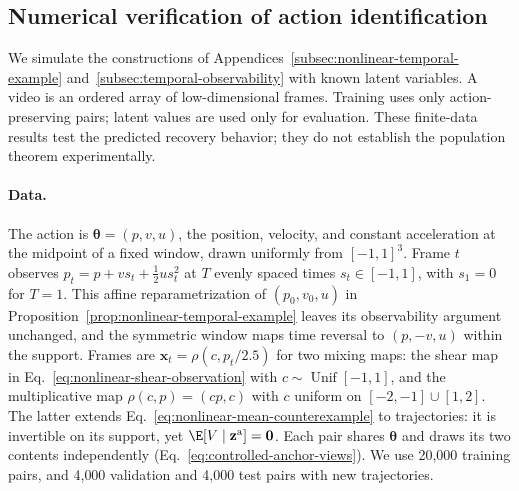 \subsection{Numerical verification of action identification}
\label{subsec:numerical-verification}

We simulate the constructions of
Appendices~\ref{subsec:nonlinear-temporal-example}
and~\ref{subsec:temporal-observability} with known latent variables.
A video is an ordered array of low-dimensional frames. Training uses only
action-preserving pairs; latent values are used only for evaluation.
These finite-data results test the predicted recovery behavior; they do
not establish the population theorem experimentally.

\paragraph{Data.}
The action is $\boldsymbol\theta=(p,v,u)$, the position, velocity, and
constant acceleration at the midpoint of a fixed window, drawn uniformly
from $[-1,1]^3$. Frame $t$ observes $p_t=p+vs_t+\tfrac12us_t^2$ at $T$
evenly spaced times $s_t\in[-1,1]$, with $s_1=0$ for $T=1$.
This affine reparametrization of $(p_0,v_0,u)$ in
Proposition~\ref{prop:nonlinear-temporal-example} leaves its observability
argument unchanged, and the symmetric window maps time reversal to
$(p,-v,u)$ within the support. Frames are $\mathbf x_t=\rho(c,p_t/2.5)$
for two mixing maps: the shear map in
Eq.~\ref{eq:nonlinear-shear-observation} with $c\sim\operatorname{Unif}[-1,1]$,
and the multiplicative map $\rho(c,p)=(cp,c)$ with $c$ uniform on
$[-2,-1]\cup[1,2]$. The latter extends
Eq.~\ref{eq:nonlinear-mean-counterexample} to trajectories: it is
invertible on its support, yet $\E[V\mid\mathbf z^{\mathrm a}]=\mathbf 0$.
Each pair shares $\boldsymbol\theta$ and draws its two contents
independently (Eq.~\ref{eq:controlled-anchor-views}). We use 20{,}000
training pairs, and 4{,}000 validation and 4{,}000 test pairs with new
trajectories.

